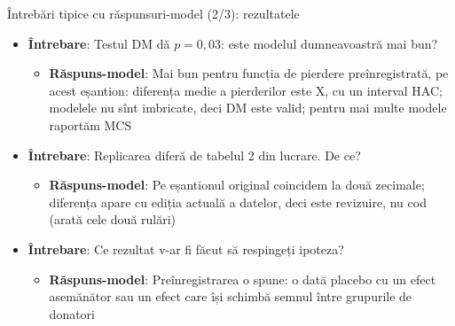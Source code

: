 \begin{frame}{Întrebări tipice cu răspunsuri-model (2/3): rezultatele}
\itemsize{\footnotesize}
\begin{itemize}
    \item \textbf{Întrebare}: Testul DM dă $p = 0{,}03$: este modelul dumneavoastră mai bun?
    \begin{itemize}
        \item \textbf{Răspuns-model}: Mai bun pentru funcția de pierdere preînregistrată, pe acest eșantion: diferența medie a pierderilor este X, cu un interval HAC; modelele nu sînt imbricate, deci DM este valid; pentru mai multe modele raportăm MCS
    \end{itemize}
    \item \textbf{Întrebare}: Replicarea diferă de tabelul 2 din lucrare. De ce?
    \begin{itemize}
        \item \textbf{Răspuns-model}: Pe eșantionul original coincidem la două zecimale; diferența apare cu ediția actuală a datelor, deci este revizuire, nu cod (arată cele două rulări)
    \end{itemize}
    \item \textbf{Întrebare}: Ce rezultat v-ar fi făcut să respingeți ipoteza?
    \begin{itemize}
        \item \textbf{Răspuns-model}: Preînregistrarea o spune: o dată placebo cu un efect asemănător sau un efect care își schimbă semnul între grupurile de donatori
    \end{itemize}
\end{itemize}
\end{frame}

